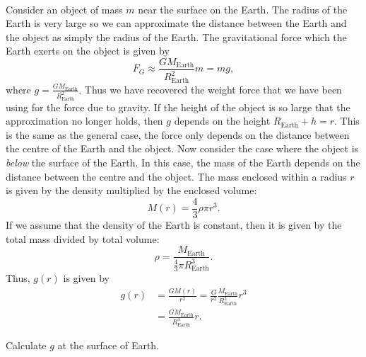 \documentclass[../newtonian_mechanics.tex]{subfiles}
\begin{document}
        \paragraph{}
        Consider an object of mass $m$ near the surface on the Earth.
        The radius of the Earth is very large so we can approximate the distance between the Earth and the object as simply the radius of the Earth.
        The gravitational force which the Earth exerts on the object is given by
        \begin{equation}
            F_G\approx\frac{GM_\text{Earth}}{R_\text{Earth}^2}m=mg,
        \end{equation}
        where $g=\frac{GM_\text{Earth}}{R_\text{Earth}^2}$.
        Thus we have recovered the weight force that we have been using for the force due to gravity.
        If the height of the object is so large that the approximation no longer holds, then $g$ depends on the height $R_\text{Earth}+h=r$.
        This is the same as the general case, the force only depends on the distance between the centre of the Earth and the object.
        Now consider the case where the object is \textit{below} the surface of the Earth.
        In this case, the mass of the Earth depends on the distance between the centre and the object.
        The mass enclosed within a radius $r$ is given by the density multiplied by the enclosed volume:
        \begin{equation}
            M(r)=\frac{4}{3}\rho\pi r^3.
        \end{equation}
        If we assume that the density of the Earth is constant, then it is given by the total mass divided by total volume:
        \begin{equation}
            \rho=\frac{M_\text{Earth}}{\frac{4}{3}\pi R_\text{Earth}^3}.
        \end{equation}
        Thus, $g(r)$ is given by
        \begin{align}
            g(r)&=\frac{GM(r)}{r^2}=\frac{G}{r^2}\frac{M_\text{Earth}}{R_\text{Earth}^3}r^3\\
            &=\frac{GM_\text{Earth}}{R_\text{Earth}^3}r.
        \end{align}
        \begin{example}
            Calculate $g$ at the surface of Earth.
        \end{example}
        
\end{document}
